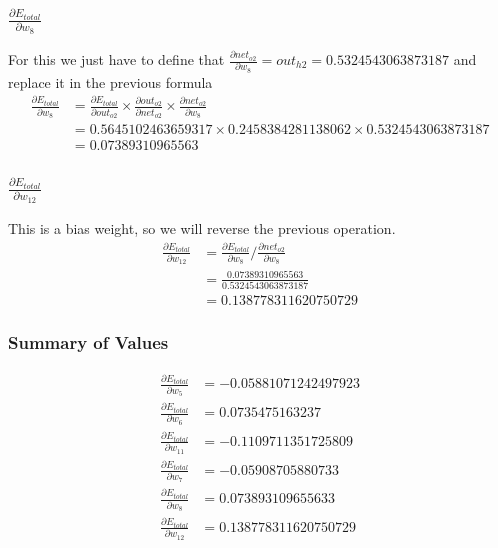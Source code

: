 \documentclass{article}
\begin{document}
\subsubsection{$\frac{\partial E_{total}}{\partial w_8}$}
For this we just have to define that $
    \frac{\partial net_{o2}}{\partial w_8} = out_{h2} = 0.5324543063873187
$ and replace it in the previous formula
\begin{align*}
    \frac{\partial E_{total}}{\partial w_8} & =
    \frac{\partial E_{total}}{\partial out_{o2}} \times
    \frac{\partial out_{o2}}{\partial net_{o2}} \times
    \frac{\partial net_{o2}}{\partial w_8} \\
    & = 0.5645102463659317 \times 0.2458384281138062 \times 0.5324543063873187
    \\
    & =0.07389310965563
\end{align*}

\subsubsection{$\frac{\partial E_{total}}{\partial w_{12}}$}
This is a bias weight, so we will reverse the previous operation.
\begin{align*}
    \frac{\partial E_{total}}{\partial w_12} & = 
    \frac{\partial E_{total}}{\partial w_8} /
    \frac{\partial net_{o2}}{\partial w_8} \\
    & = \frac{0.07389310965563}{0.5324543063873187} \\
    & = 0.138778311620750729
\end{align*}


\subsubsection{Summary of Values}
\begin{align*}
    \frac{\partial E_{total}}{\partial w_5} &= -0.05881071242497923 \\
    \frac{\partial E_{total}}{\partial w_6} &= 0.0735475163237 \\
    \frac{\partial E_{total}}{\partial w_{11}} &= -0.1109711351725809 \\
    \frac{\partial E_{total}}{\partial w_7} &= -0.05908705880733 \\
    \frac{\partial E_{total}}{\partial w_8} &= 0.073893109655633 \\
    \frac{\partial E_{total}}{\partial w_12} & = 0.138778311620750729 \\
\end{align*}
\end{document}
